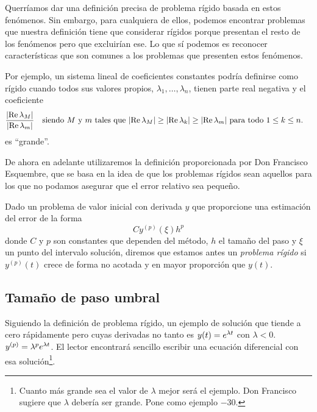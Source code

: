 Querríamos dar una definición precisa de problema rígido
basada en estos fenómenos.
Sin embargo, para cualquiera de ellos, podemos encontrar problemas
que nuestra definición tiene que considerar rígidos porque
presentan el resto de los fenómenos
pero que excluirían ese.
Lo que sí podemos es reconocer características que son comunes
a los problemas que presenten estos fenómenos.

Por ejemplo,
un sistema lineal de coeficientes constantes podría definirse como rígido
cuando todos sus valores propios, $\lambda_1,\ldots,\lambda_n$,
tienen parte real negativa y el coeficiente
%
\begin{equation*}
    \frac{\abs{\Re\lambda_M}}{\abs{\Re\lambda_m}}
    \qq{siendo $M$ y $m$ tales que
    $\abs{\Re\lambda_M} \ge \abs{\Re\lambda_k} \ge \abs{\Re\lambda_m}$
    para todo $1 \le k \le n$.}
\end{equation*}
%
es ``grande''.

De ahora en adelante utilizaremos la definición proporcionada por
Don Francisco Esquembre,
que se basa en la idea de que los problemas rígidos sean aquellos
para los que no podamos asegurar que el error relativo sea pequeño.

\begin{definition}
    Dado un problema de valor inicial con derivada $y$
    que proporcione una estimación del error de la forma
    \begin{equation*}
        Cy^{(p)}(\xi)h^p
    \end{equation*}
    donde $C$ y $p$ son constantes que dependen del método,
    $h$ el tamaño del paso y $\xi$ un punto del intervalo solución,
    diremos que estamos antes un \emph{problema rígido} si
    $y^{(p)}(t)$ crece de forma no acotada y en mayor proporción que $y(t)$.
\end{definition}

\subsection{Tamaño de paso umbral}

Siguiendo la definición de problema rígido,
un ejemplo de solución que tiende a cero rápidamente
pero cuyas derivadas no tanto es
$y(t) = e^{\lambda t}$ con $\lambda < 0$.
$y^{(p)} = \lambda^pe^{\lambda t}$.
El lector encontrará sencillo
escribir una ecuación diferencial con esa solución\footnote{
    Cuanto más grande sea el valor de $\lambda$ mejor será el ejemplo.
    Don Francisco sugiere que $\lambda$ debería ser grande.
    Pone como ejemplo $-30$.
}.

